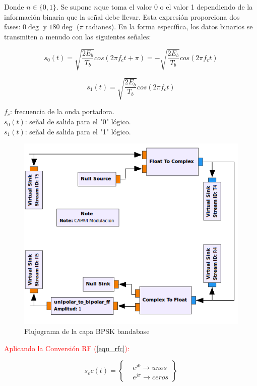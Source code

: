 \begin{itemize}
Donde $n \in \{0,1\}$. Se supone $n$que toma el valor 0 o el valor 1 dependiendo de la información binaria que la señal debe llevar. Esta expresión proporciona dos fases: $0\deg$ y $180\deg$ ($\pi$ radianes). En la forma específica, los datos binarios se transmiten a menudo con las siguientes señales:


\begin{equation} \label{capcuatro_sesentaycinco}
	s_0(t)=	\sqrt{\frac{2E_b}{T_b}}cos(2\pi f_c t+\pi)=-\sqrt{\frac{2E_b}{T_b}}cos(2\pi f_c t)			
\end{equation}

\begin{equation} \label{capcuatro_sesentayseis}
	s_1(t)=	\sqrt{\frac{2E_b}{T_b}}cos(2\pi f_c t)			
\end{equation}

$f_c$: frecuencia de la onda portadora.\\
$s_0(t)$: señal de salida para el "0" lógico.\\
$s_1(t)$: señal de salida para el "1" lógico.\\

\vspace{300px}
\begin{figure}[h!]
	\captionsetup{justification = raggedright, singlelinecheck = false}
	\caption{Flujograma de la capa BPSK bandabase}
	\label{fig:ej1_bpsk_flujo2}
    \includegraphics[width=0.6\linewidth]{Imagenes/T4_T5_parte2.png}
    \centering
\end{figure}

\textcolor{Red}{Aplicando la Conversión RF (\ref{equ_rfc}):}

\begin{equation} \label{capcuatro_sesentaysiete}
s_ec(t)=\begin{Bmatrix}
 & e^{j0} \rightarrow  unos \\ 
 & e^{j\pi}\rightarrow ceros
\end{Bmatrix}
\end{equation}


\end{itemize}
